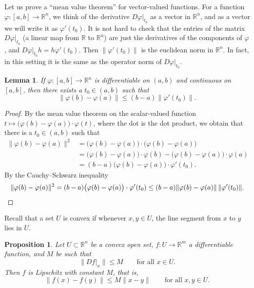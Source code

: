 \documentclass[12pt,openany]{book}
\newcommand{\snorm}[1]{\lVert {#1} \rVert}
\newcommand{\R}{{\mathbb{R}}}
\newcommand{\myquote}[1]{``#1''}
\theoremstyle{plain}
\newtheorem{lemma}[thm]{Lemma}
\newtheorem{prop}[thm]{Proposition}
\theoremstyle{remark}
\theoremstyle{definition}
\theoremstyle{exercise}
\theoremstyle{example}
\begin{document}
Let us prove a \myquote{mean value theorem} for vector-valued functions.
For a function $\varphi \colon [a,b] \to \R^n$, we think of the derivative
$D\varphi|_{t_0}$ as a vector in $\R^n$, and as
a vector we will write it as 
$\varphi'(t_0)$.
It is not hard to check that
the entries of the matrix $D\varphi|_{t_0}$
(a linear map from $\R$ to $\R^n$)
are just the derivatives of the
components of $\varphi$,
and $D\varphi|_{t_0} h = h \varphi'(t_0)$.  Then
$\snorm{\varphi'(t_0)}$
is the euclidean norm in $\R^n$.  In fact, in this setting it is the same
as the operator norm of $D\varphi|_{t_0}$.

\begin{lemma}
If $\varphi \colon [a,b] \to \R^n$ is differentiable on $(a,b)$ and
continuous on $[a,b]$, then there exists a $t_0 \in (a,b)$ such that
\begin{equation*}
\snorm{\varphi(b)-\varphi(a)} \leq (b-a) \snorm{\varphi'(t_0)} .
\end{equation*}
\end{lemma}

\begin{proof}
By the mean value theorem on the scalar-valued function
$t \mapsto \bigl(\varphi(b)-\varphi(a) \bigr) \cdot \varphi(t)$,
where the dot is the dot product, we obtain
that
there is a $t_0 \in (a,b)$ such that
\begin{equation*}
\begin{split}
\snorm{\varphi(b)-\varphi(a)}^2
& =
\bigl( \varphi(b)-\varphi(a) \bigr)
\cdot
\bigl( \varphi(b)-\varphi(a) \bigr)
\\
& =
\bigl(\varphi(b)-\varphi(a) \bigr) \cdot \varphi(b) - 
\bigl(\varphi(b)-\varphi(a) \bigr) \cdot \varphi(a)
\\
& = 
(b-a)
\bigl(\varphi(b)-\varphi(a) \bigr) \cdot \varphi'(t_0) .
\end{split}
\end{equation*}
By the Cauchy--Schwarz inequality
\begin{equation*}
\snorm{\varphi(b)-\varphi(a)}^2
=
(b-a)\bigl(\varphi(b)-\varphi(a) \bigr) \cdot \varphi'(t_0)
\leq
(b-a)
\snorm{\varphi(b)-\varphi(a)} \, \snorm{\varphi'(t_0)} . \qedhere
\end{equation*}
\end{proof}

Recall that a set $U$ is convex
if whenever $x,y \in U$, the line segment from
$x$ to $y$ lies in $U$.

\begin{prop} \label{mv:prop:convexlip}
Let $U \subset \R^n$ be a convex open set, $f \colon U \to \R^m$
a differentiable function, and $M$ be such that
\begin{equation*}
\snorm{Df|_x} \leq M
\qquad \text{for all } x \in U.
\end{equation*}
Then $f$ is Lipschitz with constant $M$, that is,
\begin{equation*}
\snorm{f(x)-f(y)} \leq M \snorm{x-y}
\qquad
\text{for all } x,y \in U.
\end{equation*}
\end{prop}
\end{document}
